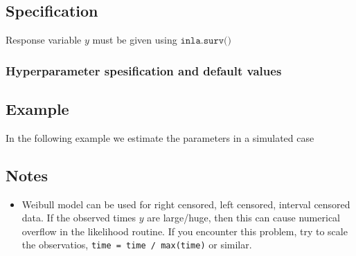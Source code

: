 \documentclass[a4paper,11pt]{article}
\begin{document}
\subsection*{Specification}

Response variable $y$ must be given using $\texttt{inla.surv()}$ 


\subsubsection*{Hyperparameter spesification and default values}

\begin{quote}
    
\end{quote}

\subsection*{Example}

In the following example we estimate the parameters in a simulated
case 

\subsection*{Notes}

\begin{itemize}
\item Weibull model can be used for right censored, left censored,
    interval censored data. If the observed times $y$ are large/huge,
    then this can cause numerical overflow in the likelihood routine.
    If you encounter this problem, try to scale the observatios,
    \verb|time = time / max(time)| or similar.
\end{itemize}
\end{document}
